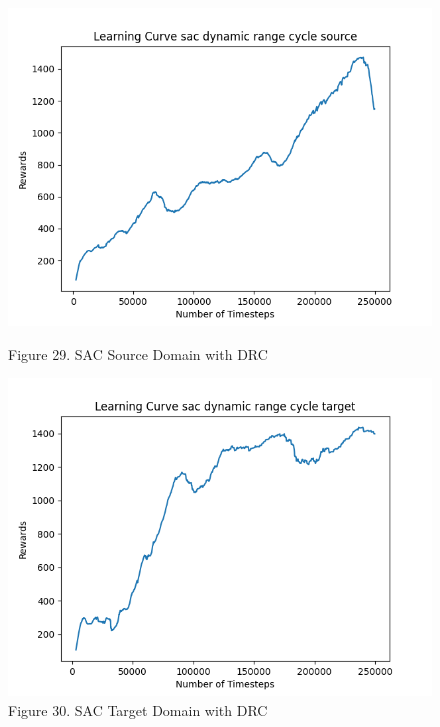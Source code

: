 \documentclass[12pt]{article}
\begin{document}
\begin{figure}[H]
    \centering
    \begin{minipage}{0.45\textwidth}
        \centering
        \includegraphics[width=\textwidth]{../images/Learning_Curve_SAC_DRC_Source.png}
        \caption{Figure 29. SAC Source Domain with DRC}
        \label{fig:sac_source_drc}
    \end{minipage}
    \hfill
    \begin{minipage}{0.45\textwidth}
        \centering
        \includegraphics[width=\textwidth]{../images/Learning_Curve_SAC_DRC_Target.png}
        \caption{Figure 30. SAC Target Domain with DRC}
        \label{fig:sac_target_drc}
    \end{minipage}

\end{figure}
\end{document}
